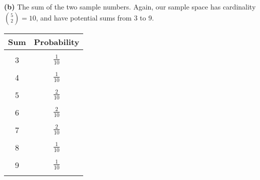 \documentclass{exam}
\begin{document}
\begin{questions}
\textbf{(b) } The sum of the two sample numbers.
\sol
Again, our sample space has cardinality $\binom{5}{2} = 10$, and have potential sums from 3 to 9.

\newline

\begin{tabular}{|c|c|}
    Sum & Probability \\
    \hline
    & \\
    3 & $\frac{1}{10}$ \\
    & \\
    4 & $\frac{1}{10}$ \\
    & \\
    5 & $\frac{2}{10}$ \\
    & \\
    6 & $\frac{2}{10}$ \\
    & \\
    7 & $\frac{2}{10}$ \\
    & \\
    8 & $\frac{1}{10}$ \\
    & \\
    9 & $\frac{1}{10}$ \\
    & \\
    \hline
\end{tabular}
\end{questions}
\end{document}
